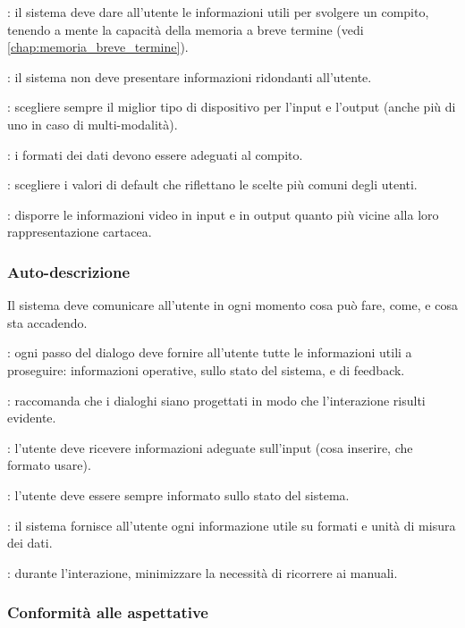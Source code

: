 : il sistema deve dare all'utente le informazioni utili per svolgere un compito, tenendo a mente la capacità della memoria a breve termine (vedi \autoref{chap:memoria_breve_termine}).

: il sistema non deve presentare informazioni ridondanti all'utente.

: scegliere sempre il miglior tipo di dispositivo per l'input e l'output (anche più di uno in caso di multi-modalità).

: i formati dei dati devono essere adeguati al compito.

: scegliere i valori di default che riflettano le scelte più comuni degli utenti.

: disporre le informazioni video in input e in output quanto più vicine alla loro rappresentazione cartacea.

\subsubsection{Auto-descrizione}

Il sistema deve comunicare all'utente in ogni momento cosa può fare, come, e cosa sta accadendo.

: ogni passo del dialogo deve fornire all'utente tutte le informazioni utili a proseguire: informazioni operative, sullo stato del sistema, e di feedback.

: raccomanda che i dialoghi siano progettati in modo che l'interazione risulti evidente.

: l'utente deve ricevere informazioni adeguate sull'input (cosa inserire, che formato usare).

: l'utente deve essere sempre informato sullo stato del sistema.

: il sistema fornisce all'utente ogni informazione utile su formati e unità di misura dei dati.

: durante l'interazione, minimizzare la necessità di ricorrere ai manuali.

\subsubsection{Conformità alle aspettative}

